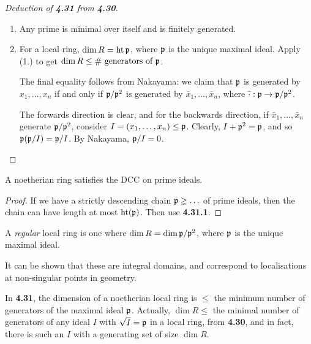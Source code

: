 \documentclass[10pt,a4paper]{article}
\begin{document}
\begin{proof}[Deduction of \textbf{4.31} from \textbf{4.30}]\hspace*{0cm}
  \begin{enumerate}
    \item Any prime is minimal over itself and is finitely generated.
    \item For a local ring, $\dim R = \operatorname{ht} \mathfrak{p}$, where $\mathfrak{p}$ is the unique maximal ideal. Apply (1.) to get $\dim R \leq \#\text{ generators of }\mathfrak{p}$.

    The final equality follows from Nakayama: we claim that $\mathfrak{p}$ is generated by $x_1, \ldots, x_n$ if and only if $\mathfrak{p}/\mathfrak{p}^2$ is generated by $\bar{x}_1, \ldots, \bar{x}_n$, where $\bar{\cdot} : \mathfrak{p} \to \mathfrak{p}/\mathfrak{p}^2$.

    The forwards direction is clear, and for the backwards direction, if $\bar{x}_1, \ldots, \bar{x}_n$ generate $\mathfrak{p}/\mathfrak{p}^2$, consider $I = (x_1, \ldots, x_n) \leq \mathfrak{p}$. Clearly, $I+\mathfrak{p}^2=\mathfrak{p}$, and so $\mathfrak{p}(\mathfrak{p}/I) = \mathfrak{p}/I$. By Nakayama, $\mathfrak{p}/I = 0$.
  \end{enumerate}
\end{proof}
\begin{corollary}
  A noetherian ring satisfies the DCC on prime ideals.
\end{corollary}
\begin{proof}
  If we have a strictly descending chain $\mathfrak{p}\gneq \ldots$ of prime ideals, then the chain can have length at most $\operatorname{ht}(\mathfrak{p})$. Then use \textbf{4.31.1}.
\end{proof}
\begin{definition}
  A \emph{regular} local ring is one where $\dim R = \dim \mathfrak{p}/\mathfrak{p}^2$, where $\mathfrak{p}$ is the unique maximal ideal.
\end{definition}
It can be shown that these are integral domains, and correspond to localisations at non-singular points in geometry.

In \textbf{4.31}, the dimension of a noetherian local ring is $\leq $ the minimum number of generators of the maximal ideal $\mathfrak{p}$. Actually, $\dim R \leq $ the minimal number of generators of any ideal $I$ with $\sqrt{I} = \mathfrak{p}$ in a local ring, from \textbf{4.30}, and in fact, there is such an $I$ with a generating set of size $\dim R$.
\end{document}

